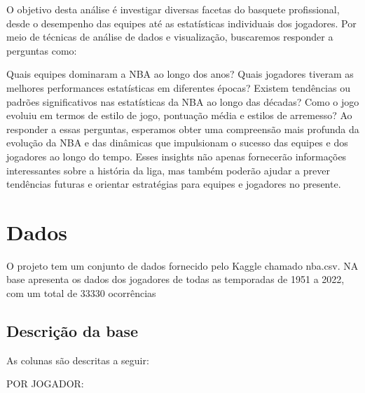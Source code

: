 \documentclass[
]{book}
\begin{document}
O objetivo desta análise é investigar diversas facetas do basquete profissional, desde o desempenho das equipes até as estatísticas individuais dos jogadores. Por meio de técnicas de análise de dados e visualização, buscaremos responder a perguntas como:

Quais equipes dominaram a NBA ao longo dos anos? Quais jogadores tiveram as melhores performances estatísticas em diferentes épocas? Existem tendências ou padrões significativos nas estatísticas da NBA ao longo das décadas? Como o jogo evoluiu em termos de estilo de jogo, pontuação média e estilos de arremesso? Ao responder a essas perguntas, esperamos obter uma compreensão mais profunda da evolução da NBA e das dinâmicas que impulsionam o sucesso das equipes e dos jogadores ao longo do tempo. Esses insights não apenas fornecerão informações interessantes sobre a história da liga, mas também poderão ajudar a prever tendências futuras e orientar estratégias para equipes e jogadores no presente.

\hypertarget{dados}{%
\chapter{Dados}\label{dados}}

O projeto tem um conjunto de dados fornecido pelo Kaggle chamado nba.csv. NA base apresenta os dados dos jogadores de todas as temporadas de 1951 a 2022, com um total de 33330 ocorrências

\hypertarget{descriuxe7uxe3o-da-base}{%
\section{Descrição da base}\label{descriuxe7uxe3o-da-base}}

As colunas são descritas a seguir:

POR JOGADOR:
\end{document}
